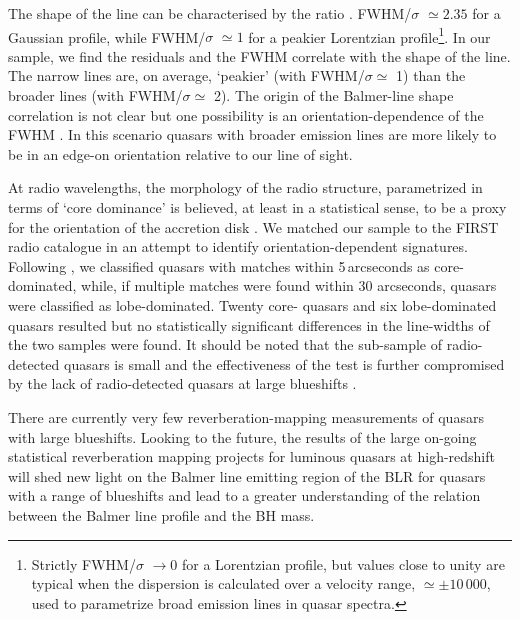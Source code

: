 The shape of the line can be characterised by the ratio \citep[FWHM/$\sigma$, where $\sigma$ is the dispersion, derived from the second moment velocity; e.g.][]{kollatschny11,Kollatschny13}. 
FWHM/$\sigma$ $\simeq 2.35$ for a Gaussian profile, while FWHM/$\sigma$ $\simeq 1$ for a peakier Lorentzian profile\footnote{Strictly FWHM/$\sigma$ $\rightarrow 0$ for a Lorentzian profile, but values close to unity are typical when the dispersion is calculated over a velocity range, $\simeq\pm10\,000$\kms, used to parametrize broad emission lines in quasar spectra.}.
In our sample, we find the residuals and the \ha FWHM correlate with the shape of the line.   
The narrow lines are, on average, `peakier' (with FWHM/$\sigma\simeq$ 1) than the broader lines (with FWHM/$\sigma\simeq$ 2).   
The origin of the Balmer-line shape correlation is not clear but one possibility is an orientation-dependence of the \ha FWHM \citep[e.g.][]{shen14}. 
In this scenario quasars with broader emission lines are more likely to be in an edge-on orientation relative to our line of sight.  
    
At radio wavelengths, the morphology of the radio structure, parametrized in terms of `core dominance' is believed, at least in a statistical sense, to be a proxy for the orientation of the accretion disk \citep[e.g.][]{jackson91}.
We matched our sample to the FIRST radio catalogue \citep{white97} in an attempt to identify orientation-dependent signatures.  
Following \citet{shen11}, we classified quasars with matches within 5\,arcseconds as core-dominated, while, if multiple matches were found within 30 arcseconds, quasars were classified as lobe-dominated. 
Twenty core- quasars and six lobe-dominated quasars resulted but no statistically significant differences in the \ha line-widths of the two samples were found. 
It should be noted that the sub-sample of radio-detected quasars is small and the effectiveness of the test is further compromised by the lack of radio-detected quasars at large blueshifts \citep[see figure 14 of][for example]{richards11}.

There are currently very few reverberation-mapping measurements of quasars with large  blueshifts.
Looking to the future, the results of the large on-going statistical reverberation mapping projects \citep[e.g.][]{shen15,kingoz15} for luminous quasars at high-redshift will shed new light on the Balmer line emitting region of the BLR for quasars with a range of  blueshifts and lead to a greater understanding of the relation between the Balmer line profile and the BH mass. 

